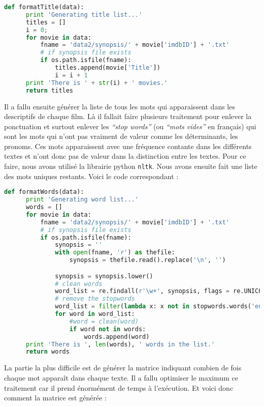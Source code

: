 \begin{lstlisting}[language=python]
  def formatTitle(data):
      print 'Generating title list...'
      titles = []
      i = 0;
      for movie in data:
          fname = 'data2/synopsis/' + movie['imdbID'] + '.txt'
          # if synopsis file exists
          if os.path.isfile(fname):
              titles.append(movie['Title'])
              i = i + 1
      print 'There is ' + str(i) + ' movies.'
      return titles
\end{lstlisting}

Il a fallu ensuite générer la liste de tous les mots qui apparaissent dans les descriptifs de chaque film. Là il fallait faire plusieurs traitement pour enlever la ponctuation et surtout enlever les \textit{``stop words''} (ou \textit{``mots vides''} en français) qui sont les mots qui n'ont pas vraiment de valeur comme les déterminants, les pronoms. Ces mots apparaissent avec une fréquence contante dans les différents textes et n'ont donc pas de valeur dans la distinction entre les textes. Pour ce faire, nous avons utilisé la librairie python \texttt{nltk}. Nous avons ensuite fait une liste des mots uniques restants. Voici le code correspondant : \\

\begin{lstlisting}[language=python]
  def formatWords(data):
      print 'Generating word list...'
      words = []
      for movie in data:
          fname = 'data2/synopsis/' + movie['imdbID'] + '.txt'
          # if synopsis file exists
          if os.path.isfile(fname):
              synopsis = ''
              with open(fname, 'r') as thefile:
                  synopsis = thefile.read().replace('\n', '')

              synopsis = synopsis.lower()
              # clean words
              word_list = re.findall(r'\w+', synopsis, flags = re.UNICODE | re.LOCALE) 
              # remove the stopwords
              word_list = filter(lambda x: x not in stopwords.words('english'), word_list)
              for word in word_list:
                  #word = clean(word)
                  if word not in words:
                      words.append(word)
      print 'There is ', len(words), ' words in the list.'
      return words
\end{lstlisting}

La partie la plus difficile est de générer la matrice indiquant combien de fois chaque mot apparaît dans chaque texte. Il a fallu optimiser le maximum ce traitement car il prend énormément de temps à l'exécution. Et voici donc comment la matrice est générée : \\

